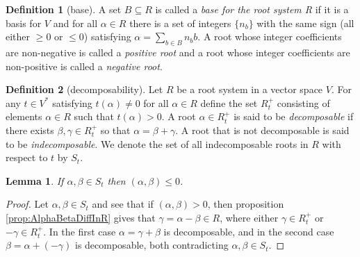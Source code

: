 \documentclass[twoside,utf8]{article}
\theoremstyle{plain}
\newtheorem{lemma}{Lemma}
\theoremstyle{definition}
\newtheorem{definition}{Definition}
\theoremstyle{remark}
\begin{document}
\begin{definition}[base]
A set $B\subseteq R$ is called a \textit{base for the root system R} if it is a basis for $V$ and for all $\alpha \in R$ there is a set of integers $\{n_b\}$ with the same sign (all either $\geq 0$ or $\leq 0$) satisfying $\alpha = \sum_{b\in B} n_b b$. A root whose integer coefficients are non-negative is called a \textit{positive root} and a root whose integer coefficients are non-positive is called a \textit{negative root}.
\end{definition}

\begin{definition}[decomposability]
Let $R$ be a root system in a vector space $V$. For any $t\in V^*$ satisfying $t(\alpha)\neq 0$ for all $\alpha \in R$ define the set $R^+_t$ consisting of elements $\alpha \in R$ such that $t(\alpha)>0$. A root $\alpha \in R_t^+$ is said to be \textit{decomposable} if there exists $\beta,\gamma \in R^+_t$ so that $\alpha=\beta+\gamma$. A root that is not decomposable is said to be \textit{indecomposable}. We denote the set of all indecomposable roots in $R$ with respect to $t$ by $S_t$.
\end{definition}

\begin{lemma} \label{lem:leq0}
If $\alpha,\beta \in S_t$ then $(\alpha,\beta)\leq 0$.
\end{lemma}
\begin{proof}
Let $\alpha, \beta \in S_t$ and see that if $(\alpha,\beta)>0$, then proposition \ref*{prop:AlphaBetaDiffInR} gives that $\gamma=\alpha-\beta \in R$, where either $\gamma \in R^+_t$ or $-\gamma \in R^+_t$. In the first case $\alpha = \gamma+\beta$ is decomposable, and in the second case $\beta = \alpha+(-\gamma)$ is decomposable, both contradicting $\alpha,\beta \in S_t$.
\end{proof}
\end{document}

